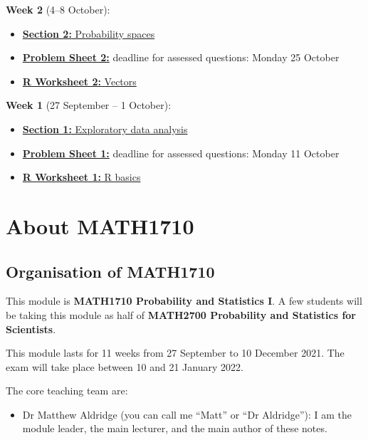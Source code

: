 \documentclass[
  a4paper,
]{book}
\providecommand{\tightlist}{%
  \setlength{\itemsep}{0pt}\setlength{\parskip}{0pt}}
\theoremstyle{definition}
\theoremstyle{definition}
\theoremstyle{definition}
\theoremstyle{definition}
\theoremstyle{remark}
\begin{document}
\textbf{Week 2} (4--8 October):

\begin{itemize}
\tightlist
\item
  \protect\hyperlink{S02-probability}{\textbf{Section 2:} Probability spaces}
\item
  \protect\hyperlink{P2}{\textbf{Problem Sheet 2:}} deadline for assessed questions: Monday 25 October
\item
  \protect\hyperlink{r-work}{\textbf{R Worksheet 2:} Vectors}
\end{itemize}

\textbf{Week 1} (27 September -- 1 October):

\begin{itemize}
\tightlist
\item
  \protect\hyperlink{S01-eda}{\textbf{Section 1:} Exploratory data analysis}
\item
  \protect\hyperlink{P1}{\textbf{Problem Sheet 1:}} deadline for assessed questions: Monday 11 October
\item
  \protect\hyperlink{r-work}{\textbf{R Worksheet 1:} R basics}
\end{itemize}

\hypertarget{about}{%
\chapter*{About MATH1710}\label{about}}

\hypertarget{organisation}{%
\section*{Organisation of MATH1710}\label{organisation}}

This module is \textbf{MATH1710 Probability and Statistics I}. A few students will be taking this module as half of \textbf{MATH2700 Probability and Statistics for Scientists}.

This module lasts for 11 weeks from 27 September to 10 December 2021. The exam will take place between 10 and 21 January 2022.

The core teaching team are:

\begin{itemize}
\tightlist
\item
  Dr Matthew Aldridge (you can call me ``Matt'' or ``Dr Aldridge''): I am the module leader, the main lecturer, and the main author of these notes.
\end{itemize}
\end{document}
